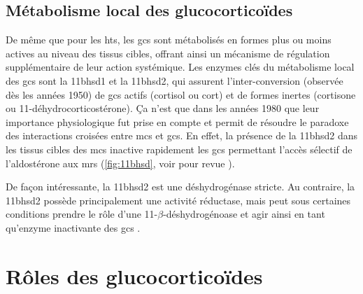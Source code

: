 \documentclass[../main.tex]{subfiles}
\begin{document}

	\subsection{Métabolisme local des glucocorticoïdes}\label{subsec:local-gc-metabo}

		De même que pour les \glspl{ht}, les \glspl{gc} sont métabolisés en formes plus ou moins actives au niveau des tissus cibles, offrant ainsi un mécanisme de régulation supplémentaire de leur action systémique.
		Les enzymes clés du métabolisme local des \glspl{gc} sont la \gls{11bhsd1}  et la \gls{11bhsd2}, qui assurent l'inter-conversion (observée dès les années 1950) de \glspl{gc} actifs (cortisol ou \gls{cort}) et de formes inertes (cortisone ou 11-déhydrocorticostérone).
		Ça n'est que dans les années 1980 que leur importance physiologique fut prise en compte \citep{Edwards1988,Funder1988} et permit de résoudre le paradoxe des interactions croisées entre \glspl{mc} et \glspl{gc}.
		En effet, la présence de la \gls{11bhsd2} dans les tissus cibles des \glspl{mc} inactive rapidement les \glspl{gc} permettant l'accès sélectif de l'aldostérone aux \glspl{mr} (\autoref{fig:11bhsd}, voir pour revue \citealp{Seckl2001}).

		

		De façon intéressante, la \gls{11bhsd2} est une déshydrogénase stricte.
		Au contraire, la \gls{11bhsd2} possède principalement une activité réductase, mais peut sous certaines conditions prendre le rôle d'une 11-$\beta$-déshydrogénoase et agir ainsi en tant qu'enzyme inactivante des \glspl{gc} \citep{Phillips1989}.




\section{Rôles des glucocorticoïdes}

\end{document}
